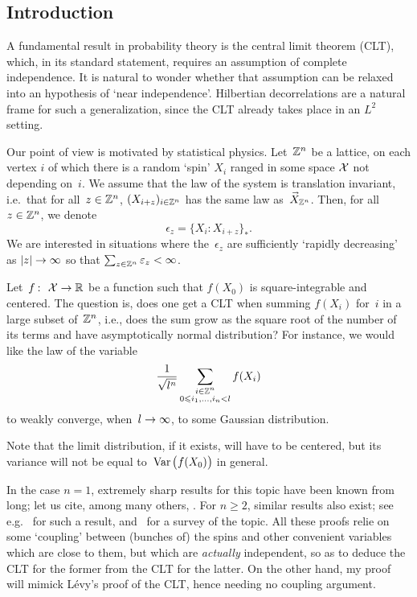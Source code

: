 \subsection{Introduction}

A fundamental result in probability theory is the central limit theorem (CLT),
which, in its standard statement, requires an assumption of complete independence.
It is natural to wonder whether that assumption can be relaxed
into an hypothesis of `near independence'.
Hilbertian decorrelations are a natural frame for such a generalization,
since the CLT already takes place in an $L^2$ setting.

Our point of view is motivated by statistical physics.
Let~$\mathbb{Z}^n$ be a lattice, on each vertex $i$ of which there is a random `spin' $X_i$
ranged in some space $\mathcal{X}$ not depending on~$i$.
We assume that the law of the system is translation invariant,
i.e.\ that for all~$z\in\mathbb{Z}^n$, $(X_{i+z})_{i\in\mathbb{Z}^n}$ has the same law
as~$\vec{X}_{\ZZ^n}$.
Then, for all~$z \in \mathbb{Z}^n$, we denote
\[\label{f5933} \epsilon_z = \{ X_i : X_{i+z} \}_* .\]
We are interested in situations where the~$\epsilon_z$ are sufficiently `rapidly decreasing'
as $|z| \to \infty$ so that $\sum_{z\in\mathbb{Z}^n} \varepsilon_z < \infty$.

Let~$f \colon \mcal{X} \to \RR$ be a function such that $f(X_0)$ is square-integrable and centered.
The question is, does one get a CLT when summing $f(X_i)$ for~$i$ in a large subset of~$\mathbb{Z}^n$,
i.e., does the sum grow as the square root of the number of its terms
and have asymptotically normal distribution?
For instance, we would like the law of the variable
\[ \frac{1}{\sqrt{l^n}} \sum_{\substack{i\in\mathbb{Z}^n\\0\leqslant i_1,\ldots,i_n<l}} f(X_i) \]
to weakly converge, when~$l \to \infty$, to some Gaussian distribution.

\begin{Rmk}
Note that the limit distribution, if it exists, will have to be centered,
but its variance will not be equal to~$\Var\big(f(X_0)\big)$ in general.
\end{Rmk}

In the case $n=1$, extremely sharp results for this topic have been known from long;
let us cite, among many others, \cite{Rosenblatt56, Ibragimov75, Peligrad87, Bradley92}.
For $n\geq 2$, similar results also exist; see e.g.\ \cite[Theorem~5]{Bradley92} for such a result,
and~\cite[\S~29]{Bradley-book} for a survey of the topic.
All these proofs relie on some `coupling' between (bunches of) the spins
and other convenient variables which are close to them,
but which are \emph{actually} independent,
so as to deduce the CLT for the former from the CLT for the latter.
On the other hand, my proof will mimick
Lévy's proof of the CLT, hence needing no coupling argument.

